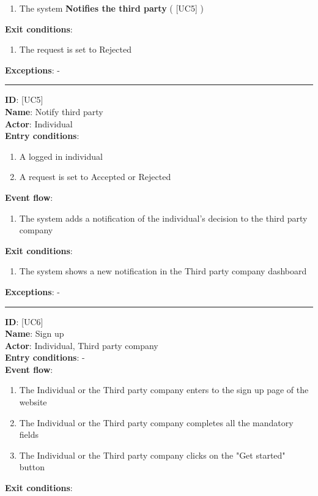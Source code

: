\documentclass[12pt]{article}
\newcommand\usecase[1]{ [UC#1] }
\begin{document}
\begin{itemize}
\begin{enumerate}
    			\item{The system \textbf{Notifies the third party} (\usecase{5})}
  		\end{enumerate}
  	\textbf{Exit conditions}:
  		\begin{enumerate}
			\item{The request is set to Rejected}
  		\end{enumerate}
  	\textbf{Exceptions}: - \\
  	\rule{\linewidth}{0.4pt}
  	\textbf{ID}: \usecase{5} \\
  	\textbf{Name}: Notify third party \\
    \textbf{Actor}: Individual \\
    \textbf{Entry conditions}: 
    		\begin{enumerate}
			\item{A logged in individual}
    			\item{A request is set to Accepted or Rejected}
  		\end{enumerate}
  	\textbf{Event flow}:
  		\begin{enumerate}
    			\item{The system adds a notification of the individual's decision to the third party company}
  		\end{enumerate}
  	\textbf{Exit conditions}:
  		\begin{enumerate}
    			\item{The system shows a new notification in the Third party company dashboard}
  		\end{enumerate}
  	\textbf{Exceptions}: - \\
  	\rule{\linewidth}{0.4pt}
  	\textbf{ID}: \usecase{6} \\
  	\textbf{Name}: Sign up \\
    \textbf{Actor}: Individual, Third party company \\
    \textbf{Entry conditions}: - \\
  	\textbf{Event flow}:
  		\begin{enumerate}
    			\item{The Individual or the Third party company enters to the sign up page of the website}
    			\item{The Individual or the Third party company completes all the mandatory fields}
    			\item{The Individual or the Third party company clicks on the "Get started" button}
  		\end{enumerate}
  	\textbf{Exit conditions}:
  		\begin{enumerate}

\end{enumerate}
\end{itemize}
\end{document}
